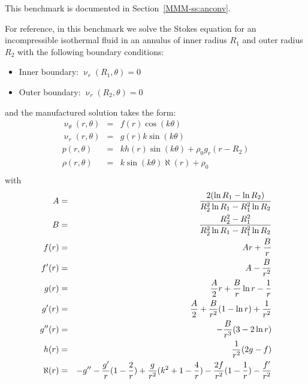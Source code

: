 This benchmark is documented in Section~\ref{MMM-ss:anconv}.

For reference, in this benchmark we solve the Stokes equation for an incompressible
isothermal fluid in an annulus of inner radius $R_1$
and outer radius $R_2$ with the following boundary conditions:
\begin{itemize}
\item Inner boundary: $\upnu_r(R_1,\theta)=0$ 
\item Outer boundary: $\upnu_r(R_2,\theta)=0$ 
\end{itemize}
and the manufactured solution takes the form:
\begin{eqnarray}
\upnu_\theta(r,\theta) &=& f(r) \cos(k\theta) \\
\upnu_r(r,\theta) &=& g(r) k  \sin(k\theta)  \\
p(r,\theta) &=& k h(r) \sin(k \theta) + \rho_0 g_r (r-R_2)  \\
\rho(r,\theta) &=& k \sin (k \theta) \aleph(r) + \rho_0 \\
\end{eqnarray}
with
\begin{eqnarray}
A &=& \frac{2(\ln R_1 - \ln R_2)} { R_2^2 \ln R_1  - R_1^2 \ln R_2}    \nonumber\\
B &=& \frac{R_2^2-R_1^2}{R_2^2 \ln R_1 - R_1^2 \ln R_2} \nonumber\\
f(r)   &=& Ar +\frac{B}{r} \nonumber\\
f'(r)  &=& A - \frac{B}{r^2} \nonumber\\
g(r)   &=& \frac{A}{2}r  +  \frac{B}{r} \ln r - \frac{1}{r} \nonumber\\
g'(r)  &=& \frac{A}{2}  +  \frac{B}{r^2} (1-\ln r)   + \frac{1}{r^2} \nonumber\\
g''(r) &=&  - \frac{B}{r^3} (3 - 2 \ln r )  \nonumber\\
h(r)   &=& \frac{1}{r^2}(2g-f) \nonumber\\
\aleph(r) &=&  -g'' - \frac{g'}{r} ( 1 - \frac{2}{r}) + \frac{g}{r^2} (k^2 + 1 -\frac{4}{r})  - \frac{2f}{r^2}  (1-\frac{1}{r}) - \frac{f'}{r^2}   \nonumber
\end{eqnarray}



